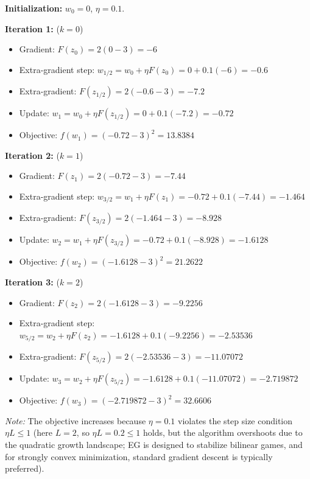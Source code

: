 \documentclass{article}
\begin{document}
\textbf{Initialization:} $w_0 = 0$, $\eta = 0.1$.

\textbf{Iteration 1:} ($k=0$)
\begin{itemize}
    \item Gradient: $F(z_0) = 2(0 - 3) = -6$
    \item Extra-gradient step: $w_{1/2} = w_0 + \eta F(z_0) = 0 + 0.1(-6) = -0.6$
    \item Extra-gradient: $F(z_{1/2}) = 2(-0.6 - 3) = -7.2$
    \item Update: $w_1 = w_0 + \eta F(z_{1/2}) = 0 + 0.1(-7.2) = -0.72$
    \item Objective: $f(w_1) = (-0.72 - 3)^2 = 13.8384$
\end{itemize}

\textbf{Iteration 2:} ($k=1$)
\begin{itemize}
    \item Gradient: $F(z_1) = 2(-0.72 - 3) = -7.44$
    \item Extra-gradient step: $w_{3/2} = w_1 + \eta F(z_1) = -0.72 + 0.1(-7.44) = -1.464$
    \item Extra-gradient: $F(z_{3/2}) = 2(-1.464 - 3) = -8.928$
    \item Update: $w_2 = w_1 + \eta F(z_{3/2}) = -0.72 + 0.1(-8.928) = -1.6128$
    \item Objective: $f(w_2) = (-1.6128 - 3)^2 = 21.2622$
\end{itemize}

\textbf{Iteration 3:} ($k=2$)
\begin{itemize}
    \item Gradient: $F(z_2) = 2(-1.6128 - 3) = -9.2256$
    \item Extra-gradient step: $w_{5/2} = w_2 + \eta F(z_2) = -1.6128 + 0.1(-9.2256) = -2.53536$
    \item Extra-gradient: $F(z_{5/2}) = 2(-2.53536 - 3) = -11.07072$
    \item Update: $w_3 = w_2 + \eta F(z_{5/2}) = -1.6128 + 0.1(-11.07072) = -2.719872$
    \item Objective: $f(w_3) = (-2.719872 - 3)^2 = 32.6606$
\end{itemize}
\textit{Note:} The objective increases because $\eta=0.1$ violates the step size condition $\eta L \leq 1$ (here $L=2$, so $\eta L = 0.2 \leq 1$ holds, but the algorithm overshoots due to the quadratic growth landscape; EG is designed to stabilize bilinear games, and for strongly convex minimization, standard gradient descent is typically preferred).
\end{document}
